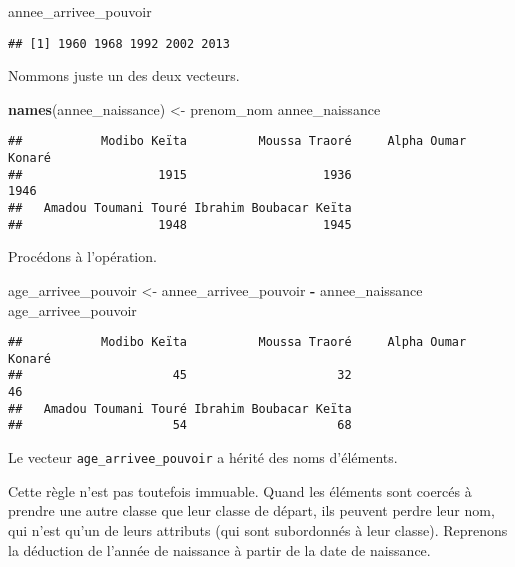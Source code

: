 \documentclass[]{book}
\newenvironment{Shaded}{\begin{snugshade}}{\end{snugshade}}
\newcommand{\KeywordTok}[1]{\textcolor[rgb]{0.13,0.29,0.53}{\textbf{#1}}}
\newcommand{\StringTok}[1]{\textcolor[rgb]{0.31,0.60,0.02}{#1}}
\newcommand{\OperatorTok}[1]{\textcolor[rgb]{0.81,0.36,0.00}{\textbf{#1}}}
\newcommand{\NormalTok}[1]{#1}
\begin{document}
\begin{Shaded}
\begin{Highlighting}[]
\NormalTok{annee_arrivee_pouvoir}
\end{Highlighting}
\end{Shaded}

\begin{verbatim}
## [1] 1960 1968 1992 2002 2013
\end{verbatim}

Nommons juste un des deux vecteurs.

\begin{Shaded}
\begin{Highlighting}[]
\KeywordTok{names}\NormalTok{(annee_naissance) <-}\StringTok{ }\NormalTok{prenom_nom}
\NormalTok{annee_naissance}
\end{Highlighting}
\end{Shaded}

\begin{verbatim}
##           Modibo Keïta          Moussa Traoré     Alpha Oumar Konaré 
##                   1915                   1936                   1946 
##   Amadou Toumani Touré Ibrahim Boubacar Keïta 
##                   1948                   1945
\end{verbatim}

Procédons à l'opération.

\begin{Shaded}
\begin{Highlighting}[]
\NormalTok{age_arrivee_pouvoir <-}\StringTok{ }\NormalTok{annee_arrivee_pouvoir }\OperatorTok{-}\StringTok{ }\NormalTok{annee_naissance}
\NormalTok{age_arrivee_pouvoir}
\end{Highlighting}
\end{Shaded}

\begin{verbatim}
##           Modibo Keïta          Moussa Traoré     Alpha Oumar Konaré 
##                     45                     32                     46 
##   Amadou Toumani Touré Ibrahim Boubacar Keïta 
##                     54                     68
\end{verbatim}

Le vecteur \texttt{age\_arrivee\_pouvoir} a hérité des noms d'éléments.

Cette règle n'est pas toutefois immuable. Quand les éléments sont
coercés à prendre une autre classe que leur classe de départ, ils
peuvent perdre leur nom, qui n'est qu'un de leurs attributs (qui sont
subordonnés à leur classe). Reprenons la déduction de l'année de
naissance à partir de la date de naissance.
\end{document}
